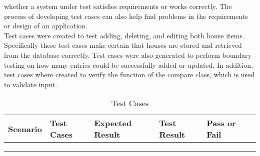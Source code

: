 \documentclass[12pt,a4paper]{report}
\begin{document}
{{{whether a system under test satisfies requirements or works correctly. The process of
developing test cases can also help find problems in the requirements or design of an
application.\\Test cases were created to test adding, deleting, and editing both house items.
Specifically these test cases make certain that houses are stored and retrieved
from the database correctly. Test cases were also generated to perform boundary testing
on how many entries could be successfully added or updated. In addition, test cases where
created to verify the function of the compare class, which is used to validate input.	

\begin{table}[H]
\center
\renewcommand\arraystretch{0}
		\label{tab:Test}
\caption{\hspace{0.4em}Test Cases}
\vspace{0.2cm}
\begin{tabular}{M{2cm}|M{3cm}|M{3cm}|M{3cm}|M{1.5cm}N}
\hline
\textbf{Scenario} &
{\textbf{Test Cases}} & 
{\textbf{Expected Result}} & %
{\textbf{Test Result}} &
\textbf{Pass or Fail} & \\ [10pt]
\hline
\fontsize {10}{8}\selectfont {} & 
\fontsize {10}{8}\selectfont {Enter null in
mandatory fields.} & 
\fontsize {10}{8}\selectfont {It should not do the
registration and
show error.} & 
\fontsize {10}{8}\selectfont {It will show
message that please
fill out this field.} & 
\fontsize {10}{8}\selectfont {Pass} &\\[30pt]

\fontsize {10}{8}\selectfont {Registration} & 
\fontsize {10}{8}\selectfont {Enter incorrect data} & 
\fontsize {10}{8}\selectfont {It should not do the
registration and
show error.} & 
\fontsize {10}{8}\selectfont {Email: Please enter
an email.
Password:
Password.
do not match} & 
\fontsize {10}{8}\selectfont {Pass} &\\[35pt]

\fontsize {10}{8}\selectfont {} & 
\fontsize {10}{8}\selectfont {Enter correct data of
all required field} & 
\fontsize {10}{8}\selectfont {It should lead to
successfully
registration} & 
\fontsize {10}{8}\selectfont {It will show the
message of
successfully
registrattion} & 
\fontsize {10}{8}\selectfont {Pass} &\\[40pt]
\hline%


\end{tabular}
\end{table}}}}
\end{document}
